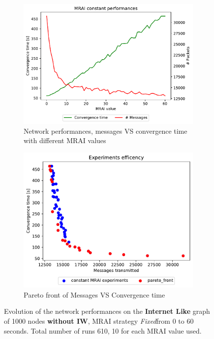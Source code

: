 \begin{figure}[h]
     \centering
     \begin{subfigure}[b]{0.45\textwidth}
         \centering
         \includegraphics[width=\textwidth]{images/internet_like/1000/constantMRAI/internet_like-constant-noIW_mrai_evolution.pdf}
		 \caption{Network performances, messages VS convergence time with different
			\ac{MRAI} values}
         \label{fig:internt_like_1000_constant_noIW_evolution_evolution}
     \end{subfigure}
     \hfill
     \begin{subfigure}[b]{0.45\textwidth}
         \centering
         \includegraphics[width=\textwidth]{images/internet_like/1000/constantMRAI/internet_like-constant-noIW.pdf}
		 \caption{Pareto front of Messages VS Convergence time}
         \label{fig:internt_like_1000_constant_noIW_evolution_paretoFront}
     \end{subfigure}
		\caption{Evolution of the network performances on the \textbf{Internet Like} graph
			of \num{1000} nodes \textbf{without \ac{IW}}, \ac{MRAI} strategy
			\textit{Fixed}from \num{0} to \num{60} seconds. Total number of
			runs \num{610}, \num{10} for each \ac{MRAI} value used.}
        \label{fig:internet_like_1000_constant_evolution_noIW}
\end{figure}

